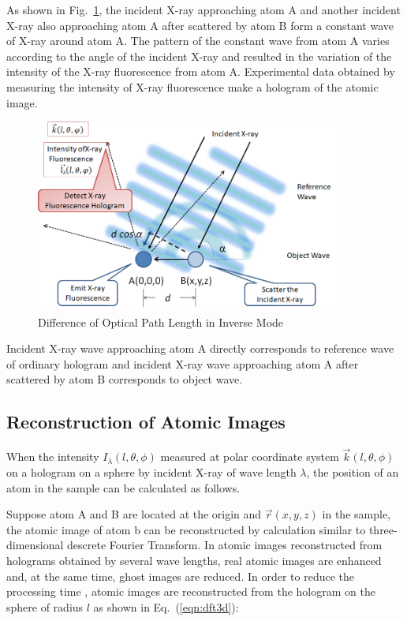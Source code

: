 \documentclass[graybox,vecphys]{svmult}
\begin{document}
As shown in Fig.~\ref{fig:inversemode}, the incident X-ray approaching
atom A and another incident X-ray also approaching atom A after
scattered by atom B form a constant wave of X-ray around atom A.
The pattern of the constant wave from atom A varies according to
the angle of the incident X-ray and resulted in the variation of
the intensity of the X-ray fluorescence from atom A. Experimental
data obtained by measuring the intensity of X-ray fluorescence
make a hologram of the atomic image.

\begin{figure}[bt]
  \begin{center}
    \includegraphics[width=10cm]{inversemode_alpha.png}
    \caption{Difference of Optical Path Length in Inverse Mode}\label{fig:inversemode}
  \end{center}
\end{figure}

Incident X-ray wave approaching atom A directly corresponds to
reference wave of ordinary hologram and incident X-ray wave
approaching atom A after scattered by atom B corresponds to
object wave.


\subsection{Reconstruction of Atomic Images}
\label{subsec:reconst}

When the intensity $I_{\lambda}(l,\theta,\phi)$ measured at polar
coordinate system $\vec{k}(l,\theta,\phi)$ on a hologram on a sphere
by incident X-ray of wave length $\lambda$, the position of an atom
in the sample can be calculated as follows.

Suppose atom A and B are located at the origin and $\vec{r}(x,y,z)$
in the sample, the atomic image of atom b can be reconstructed by
calculation similar to three-dimensional descrete Fourier Transform.
In atomic images reconstructed from holograms obtained by several wave
lengths, real atomic images are enhanced and, at the same time, ghost
images are reduced\cite{Hayashi-JSSRR2013-Eng}.  In order to reduce
the processing time , atomic images are reconstructed from the
hologram on the sphere of radius $l$ as shown in Eq.~(\ref{eqn:dft3d}):
\end{document}
